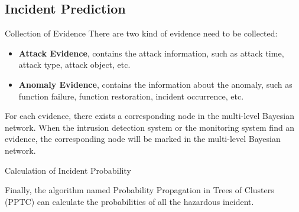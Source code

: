 \subsection{Incident Prediction}
\begin{frame}{Collection of Evidence}
    There are two kind of evidence need to be collected:
    \begin{itemize}
      \item \textbf{Attack Evidence}, contains the attack information, such as attack time, attack type, attack object, etc.
      \item \textbf{Anomaly Evidence}, contains the information about the anomaly, such as function failure, function restoration, incident occurrence, etc.
    \end{itemize}
    \pause
    
    For each evidence, there exists a corresponding node in the multi-level Bayesian network. When the intrusion detection system or the monitoring system find an evidence, the corresponding node will be marked in the multi-level Bayesian network.
\end{frame}

\begin{frame}{Calculation of Incident Probability}
    \begin{center}
      
    \end{center}
    Finally, the algorithm named Probability Propagation in Trees of Clusters (PPTC) can calculate the probabilities of all the hazardous incident.
\end{frame}